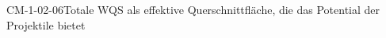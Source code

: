
\begin{CONC}{CM-1-02-06}{Totale WQS als effektive Querschnittfläche, die das Potential der Projektile bietet}
\end{CONC}
